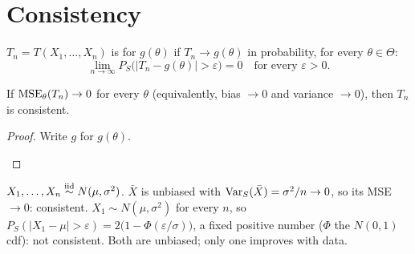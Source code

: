 \section{Consistency}

\begin{definition}
$T_n=T(X_1,\dots,X_n)$ is  for $g(\theta)$ if $T_n\to g(\theta)$ in probability, for every $\theta\in\Theta$:
\[
  \boxed{\;\lim_{n\to\infty}P_S\big(|T_n-g(\theta)|>\varepsilon\big)=0\quad\text{for every }\varepsilon>0.\;}
\]
\end{definition}

\begin{theorem}
If $\operatorname{MSE}_\theta(T_n)\to0$ for every $\theta$ (equivalently, bias $\to0$ and variance $\to0$), then $T_n$ is consistent.
\end{theorem}
\begin{proof}
Write $g$ for $g(\theta)$.
\begin{deriv}
\end{deriv}
\end{proof}

\begin{example}
$X_1,\dots,X_n\overset{\text{iid}}{\sim} N(\mu,\sigma^2)$. $\bar X$ is unbiased with $\operatorname{Var}_S(\bar X)=\sigma^2/n\to0$, so its MSE $\to0$: consistent. $X_1\sim N(\mu,\sigma^2)$ for every $n$, so $P_S(|X_1-\mu|>\varepsilon)=2\big(1-\Phi(\varepsilon/\sigma)\big)$, a fixed positive number ($\Phi$ the $N(0,1)$ cdf): not consistent. Both are unbiased; only one improves with data.
\end{example}

